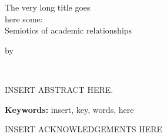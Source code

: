 \vspace{1.2cm}
\begin{center}\begin{spacing}{1}
{\Large The very long title goes\\\smallskip here some:\\\bigskip Semiotics of academic relationships\\}
\vspace{24pt}
{\Large by
\par
\vspace{5pt}
\namen\\[1.2cm]}
\end{spacing}\end{center}
\noindent
\begin{spacing}{1.7}
\Charter
INSERT ABSTRACT HERE.
\end{spacing}
\begin{spacing}{1}
\vspace{40pt}

\noindent
\textbf{Keywords:} insert, key, words, here
\end{spacing}
\medskip



\newpage
{}
\begin{spacing}{1}
        \ackname
\end{spacing}
INSERT ACKNOWLEDGEMENTS HERE
\newpage




